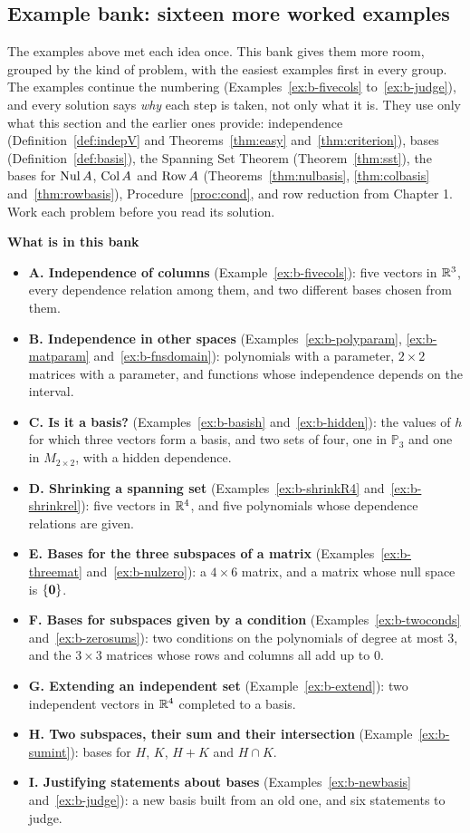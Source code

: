 \documentclass[11pt]{article}
\begin{document}
\subsection*{Example bank: sixteen more worked examples}

The examples above met each idea once. This bank gives them more room, grouped by the kind of problem, with the easiest examples first in every group. The examples continue the numbering (Examples~\ref{ex:b-fivecols} to~\ref{ex:b-judge}), and every solution says \emph{why} each step is taken, not only what it is. They use only what this section and the earlier ones provide: independence (Definition~\ref{def:indepV} and Theorems~\ref{thm:easy} and~\ref{thm:criterion}), bases (Definition~\ref{def:basis}), the Spanning Set Theorem (Theorem~\ref{thm:sst}), the bases for $\operatorname{Nul} A$, $\operatorname{Col} A$ and $\operatorname{Row} A$ (Theorems~\ref{thm:nulbasis}, \ref{thm:colbasis} and~\ref{thm:rowbasis}), Procedure~\ref{proc:cond}, and row reduction from Chapter 1. Work each problem before you read its solution.

\textbf{What is in this bank}
\begin{itemize}
  \item \textbf{A. Independence of columns} (Example~\ref{ex:b-fivecols}): five vectors in $\mathbb{R}^3$, every dependence relation among them, and two different bases chosen from them.
  \item \textbf{B. Independence in other spaces} (Examples~\ref{ex:b-polyparam}, \ref{ex:b-matparam} and~\ref{ex:b-fnsdomain}): polynomials with a parameter, $2\times2$ matrices with a parameter, and functions whose independence depends on the interval.
  \item \textbf{C. Is it a basis?} (Examples~\ref{ex:b-basish} and~\ref{ex:b-hidden}): the values of $h$ for which three vectors form a basis, and two sets of four, one in $\mathbb{P}_3$ and one in $M_{2\times2}$, with a hidden dependence.
  \item \textbf{D. Shrinking a spanning set} (Examples~\ref{ex:b-shrinkR4} and~\ref{ex:b-shrinkrel}): five vectors in $\mathbb{R}^4$, and five polynomials whose dependence relations are given.
  \item \textbf{E. Bases for the three subspaces of a matrix} (Examples~\ref{ex:b-threemat} and~\ref{ex:b-nulzero}): a $4\times6$ matrix, and a matrix whose null space is $\{\mathbf{0}\}$.
  \item \textbf{F. Bases for subspaces given by a condition} (Examples~\ref{ex:b-twoconds} and~\ref{ex:b-zerosums}): two conditions on the polynomials of degree at most $3$, and the $3\times3$ matrices whose rows and columns all add up to $0$.
  \item \textbf{G. Extending an independent set} (Example~\ref{ex:b-extend}): two independent vectors in $\mathbb{R}^4$ completed to a basis.
  \item \textbf{H. Two subspaces, their sum and their intersection} (Example~\ref{ex:b-sumint}): bases for $H$, $K$, $H+K$ and $H\cap K$.
  \item \textbf{I. Justifying statements about bases} (Examples~\ref{ex:b-newbasis} and~\ref{ex:b-judge}): a new basis built from an old one, and six statements to judge.
\end{itemize}
\end{document}
